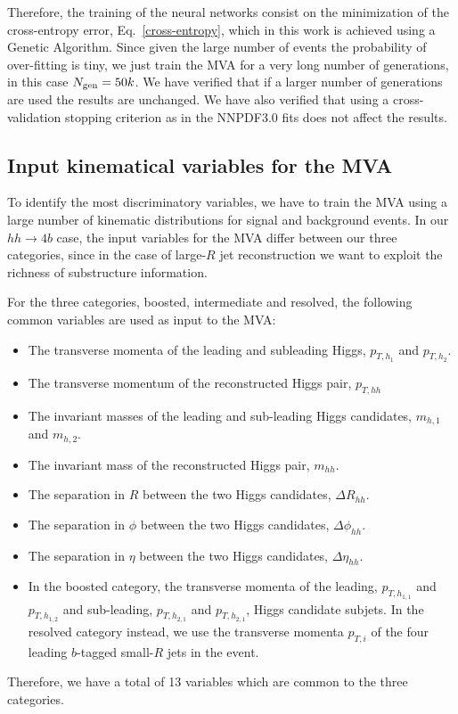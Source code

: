  Therefore, the training of the neural networks consist on the
 minimization of the cross-entropy error,
 Eq.~\ref{cross-entropy}, which in this work is achieved using a
 Genetic Algorithm.
 Since given the large number of events the probability of
 over-fitting is tiny, we just train the MVA for a very long
 number of generations, in this case $N_{\rm gen}=50k$.
 We have verified that if a larger number of generations
 are used the results are unchanged.
 We have also verified that using a cross-validation stopping
 criterion as in the NNPDF3.0 fits does not affect the results.

 

 \subsection{Input kinematical variables for the MVA}
 \label{sec:input}

 To identify the most discriminatory variables, we have to train
 the MVA using a large number of kinematic distributions for
 signal and background events.
%
In our $hh\to 4b$ case,
the input variables for the MVA differ between our three categories,
since in the case of large-$R$ jet reconstruction we want to exploit
the richness of substructure information.

For the three categories, boosted, intermediate and resolved,
the following common variables are used as input to the MVA:
\begin{itemize}
\item The transverse momenta of the leading and subleading Higgs, $p_{T,h_1}$ and $p_{T,h_2}$.
\item The transverse momentum of the reconstructed Higgs pair, $p_{T,hh}$
\item The invariant masses of the leading and sub-leading Higgs candidates, $m_{h,1}$ and $m_{h,2}$.
\item The invariant mass of the reconstructed Higgs pair, $m_{hh}$.
\item The separation in $R$ between the two Higgs candidates, $\Delta R_{hh}$.
\item The separation in $\phi$  between the two Higgs candidates, $\Delta \phi_{hh}$.
\item The separation in $\eta$  between the two Higgs candidates, $\Delta \eta_{hh}$.
\item In the boosted category,
  the transverse momenta of the leading, $p_{T,h_{1,1}}$ and $p_{T,h_{1,2}}$ and
  sub-leading, $p_{T,h_{2,1}}$ and $p_{T,h_{2,1}}$, Higgs candidate subjets.
  In the resolved category instead, we use the transverse momenta $p_{T,i}$ of the four leading 
   $b$-tagged small-$R$ jets in the event. 
\end{itemize}
Therefore, we have a total of 13 variables which are common to the three categories.
%


